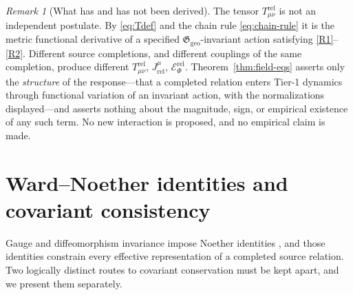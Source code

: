 \documentclass[11pt,a4paper]{article}
\theoremstyle{plain}
\theoremstyle{definition}
\theoremstyle{remark}
\newtheorem{remark}[theorem]{Remark}
\newcommand{\Ggeo}{\mathfrak{G}_{\mathrm{geo}}}
\begin{document}
\begin{remark}[What has and has not been derived]
\label{rem:not-postulated}
The tensor $T^{\mathrm{rel}}_{\mu\nu}$ is not an independent postulate. By \eqref{eq:Tdef} and the
chain rule \eqref{eq:chain-rule} it is the metric functional derivative of a specified
$\Ggeo$-invariant action satisfying \ref{R1}--\ref{R2}. Different source completions, and
different couplings of the same completion, produce different $T^{\mathrm{rel}}_{\mu\nu}$,
$J^{\mu}_{\mathrm{rel}}$, $\mathcal{E}^{\mathrm{rel}}_{\Phi}$. Theorem~\ref{thm:field-eqs} asserts
only the \emph{structure} of the response---that a completed relation enters Tier-1 dynamics through
functional variation of an invariant action, with the normalizations displayed---and asserts nothing
about the magnitude, sign, or empirical existence of any such term. No new interaction is proposed,
and no empirical claim is made.
\end{remark}

\section{Ward--Noether identities and covariant consistency}
\label{sec:noether}

Gauge and diffeomorphism invariance impose Noether identities \cite{Noether1918}, and those
identities constrain every effective representation of a completed source relation. Two logically
distinct routes to covariant conservation must be kept apart, and we present them separately.
\end{document}
